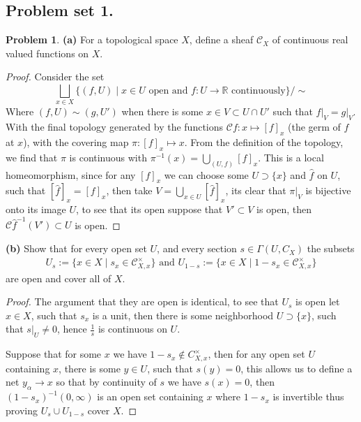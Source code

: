 \documentclass[10.5pt]{article}
\theoremstyle{definition}
\newtheorem{pb}{Problem}
\newcommand{\set}[1]{\{#1\}}
\newcommand{\tand}{\text{ and }}
\begin{document}
    \subsection{Problem set 1.}
    \begin{pb}
        \textbf{(a)} For a topological space \(X\), define a sheaf \(\mathcal{C}_X\) of continuous real valued functions on \(X\).
        \begin{proof}
        Consider the set 
        \[\bigsqcup_{x \in X} \set{(f,U) \mid x \in U \text{ open and }f:U\to \mathbb{R} \text{ continuously}}/\sim\]
        Where \((f,U) \sim (g,U')\) when there is some \(x \in V \subset U \cap U'\) such that \(f\vert_V = g\vert_V\).
        With the final topology generated by the functions \(\mathcal{C}f: x \mapsto [f]_x\) (the germ of \(f\) at \(x\)), with the covering map \(\pi: [f]_x \mapsto x\). From the definition of the topology, we find that \(\pi\) is continuous with \(\pi^{-1}(x) = \bigcup_{(U,f)} [f]_x\). This is a local homeomorphism, since for any \([f]_x\) we can choose some \(U \supset \set{x}\) and \(\hat{f}\) on \(U\), such that \([\hat{f}]_x = [f]_x\), then take \(V = \bigcup_{x \in U}[\hat{f}]_x\), its clear that \(\pi\vert_V\) is bijective onto its image \(U\), to see that its open suppose that \(V' \subset V\) is open, then \(\mathcal{C}\hat{f}^{-1}(V') \subset U\) is open.
        \end{proof}
        \textbf{(b)} Show that for every open set \(U\), and every section \(s \in \Gamma(U,C_X)\) the subsets
        \begin{align*}
            U_s := \set{x \in X \mid s_x \in \mathcal{C}_{X,x}^\times} \tand U_{1-s} := \set{x \in X \mid 1 - s_x \in \mathcal{C}_{X,x}^\times}
        \end{align*}
        are open and cover all of \(X\).
        \begin{proof}
            The argument that they are open is identical, to see that \(U_s\) is open let \(x \in X\), such that \(s_x\) is a unit, then there is some neighborhood \(U \supset \set{x}\), such that \(s\vert_U \neq 0\), hence \(\frac{1}{s}\) is continuous on \(U\).

            Suppose that for some \(x\) we have \(1-s_x \not \in C_{X,x}^\times\), then for any open set \(U\) containing \(x\), there is some \(y \in U\), such that \(s(y) = 0\), this allows us to define a net \(y_\alpha \to x\) so that by continuity of \(s\) we have \(s(x) = 0\), then \((1-s_x)^{-1}(0,\infty)\) is an open set containing \(x\) where \(1-s_x\) is invertible thus proving \(U_s \cup U_{1-s}\) cover \(X\).
        \end{proof}
    \end{pb}
\end{document}

